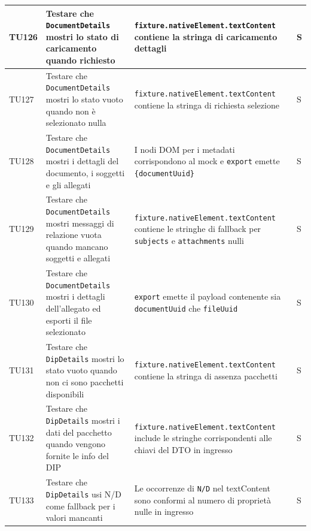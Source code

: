 \documentclass[a4paper,12pt]{article}
\begin{document}
\begin{longtable}{|M{1.2cm}|M{5cm}|M{7cm}|M{1.5cm}|}
            TU126 & Testare che \texttt{DocumentDetails} mostri lo stato di caricamento quando richiesto & \texttt{fixture.nativeElement.textContent} contiene la stringa di caricamento dettagli & S \\ 
            \hline
            
            TU127 & Testare che \texttt{DocumentDetails} mostri lo stato vuoto quando non è selezionato nulla & \texttt{fixture.nativeElement.textContent} contiene la stringa di richiesta selezione & S \\ 
            \hline
            
            TU128 & Testare che \texttt{DocumentDetails} mostri i dettagli del documento, i soggetti e gli allegati & I nodi DOM per i metadati corrispondono al mock e \texttt{export} emette \texttt{\{documentUuid\}} & S \\ 
            \hline
            
            TU129 & Testare che \texttt{DocumentDetails} mostri messaggi di relazione vuota quando mancano soggetti e allegati & \texttt{fixture.nativeElement.textContent} contiene le stringhe di fallback per \texttt{subjects} e \texttt{attachments} nulli & S \\ 
            \hline
            
            TU130 & Testare che \texttt{DocumentDetails} mostri i dettagli dell'allegato ed esporti il file selezionato & \texttt{export} emette il payload contenente sia \texttt{documentUuid} che \texttt{fileUuid} & S \\ 
            \hline
            
            TU131 & Testare che \texttt{DipDetails} mostri lo stato vuoto quando non ci sono pacchetti disponibili & \texttt{fixture.nativeElement.textContent} contiene la stringa di assenza pacchetti & S \\ 
            \hline
            
            TU132 & Testare che \texttt{DipDetails} mostri i dati del pacchetto quando vengono fornite le info del DIP & \texttt{fixture.nativeElement.textContent} include le stringhe corrispondenti alle chiavi del DTO in ingresso & S \\ 
            \hline
            
            TU133 & Testare che \texttt{DipDetails} usi N/D come fallback per i valori mancanti & Le occorrenze di \texttt{N/D} nel textContent sono conformi al numero di proprietà nulle in ingresso & S \\ 
            \hline


\end{longtable}
\end{document}
